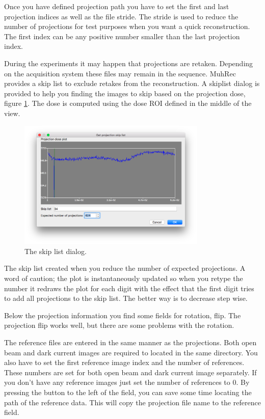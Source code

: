 \documentclass[a4paper]{scrreprt}
\begin{document}
Once you have defined projection path you have to set the first and last projection indices as well as the file stride. The stride is used to reduce the number of projections for test purposes when you want a quick reconstruction. The first index can be any positive number smaller than the last projection index.

During the experiments it may happen that projections are retaken. Depending on the acquisition system these files may remain in the sequence. MuhRec provides a skip list to exclude retakes from the reconstruction. A skiplist dialog is provided to help you finding the images to skip based on the projection dose, figure \ref{fig_SkipList}. The dose is computed using the dose ROI defined in the middle of the view.
\begin{figure}[ht!]
\centering
 \includegraphics[width=0.8\textwidth]{figures3/Dialog_SkipList.png}
\caption{The skip list dialog.}\label{fig_SkipList}
\end{figure}
The skip list created when you reduce the number of expected projections. A word of caution; the plot is instantaneously updated so when you retype the number it redraws the plot for each digit with the effect that the first digit tries to add all projections to the skip list. The better way is to decrease step wise. 

Below the projection information you find some fields for rotation, flip. The projection flip works well, but there are some problems with the rotation.

The reference files are entered in the same manner as the projections. Both open beam and dark current images are required to located in the same directory. You also have to set the first reference image index and the number of references. These numbers are set for both open beam and dark current image separately. If you don't have any reference images just set the number of references to 0. By pressing the button to the left of the field, you can save some time locating the path of the reference data. This will copy the projection file name to the reference field.
\end{document}
